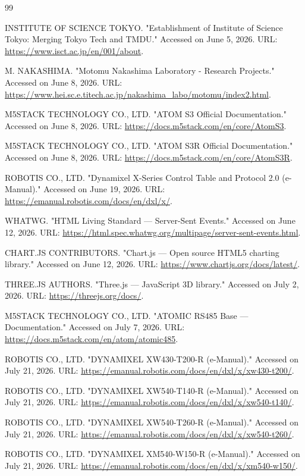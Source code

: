 \documentclass{tropLaClasse}
\begin{document}
\begin{thebibliography}{99}
\setcounter{enumiv}{15} %

\vspace{-0.5cm}

 INSTITUTE OF SCIENCE TOKYO. "Establishment of Institute of Science Tokyo: Merging Tokyo Tech and TMDU." Accessed on June 5, 2026. URL: \url{https://www.isct.ac.jp/en/001/about}.

 M. NAKASHIMA. "Motomu Nakashima Laboratory - Research Projects." Accessed on June 8, 2026. URL: \url{https://www.hei.sc.e.titech.ac.jp/nakashima_labo/motomu/index2.html}.

 M5STACK TECHNOLOGY CO., LTD. "ATOM S3 Official Documentation." Accessed on June 8, 2026. URL: \url{https://docs.m5stack.com/en/core/AtomS3}.

 M5STACK TECHNOLOGY CO., LTD. "ATOM S3R Official Documentation." Accessed on June 8, 2026. URL: \url{https://docs.m5stack.com/en/core/AtomS3R}.

 ROBOTIS CO., LTD. "Dynamixel X-Series Control Table and Protocol 2.0 (e-Manual)." Accessed on June 19, 2026. URL: \url{https://emanual.robotis.com/docs/en/dxl/x/}.

 WHATWG. "HTML Living Standard --- Server-Sent Events." Accessed on June 12, 2026. URL: \url{https://html.spec.whatwg.org/multipage/server-sent-events.html}.

 CHART.JS CONTRIBUTORS. "Chart.js --- Open source HTML5 charting library." Accessed on June 12, 2026. URL: \url{https://www.chartjs.org/docs/latest/}.

 THREE.JS AUTHORS. "Three.js --- JavaScript 3D library." Accessed on July 2, 2026. URL: \url{https://threejs.org/docs/}.

 M5STACK TECHNOLOGY CO., LTD. "ATOMIC RS485 Base --- Documentation." Accessed on July 7, 2026. URL: \url{https://docs.m5stack.com/en/atom/atomic485}.

 ROBOTIS CO., LTD. "DYNAMIXEL XW430-T200-R (e-Manual)." Accessed on July 21, 2026. URL: \url{https://emanual.robotis.com/docs/en/dxl/x/xw430-t200/}.

 ROBOTIS CO., LTD. "DYNAMIXEL XW540-T140-R (e-Manual)." Accessed on July 21, 2026. URL: \url{https://emanual.robotis.com/docs/en/dxl/x/xw540-t140/}.

 ROBOTIS CO., LTD. "DYNAMIXEL XW540-T260-R (e-Manual)." Accessed on July 21, 2026. URL: \url{https://emanual.robotis.com/docs/en/dxl/x/xw540-t260/}.

 ROBOTIS CO., LTD. "DYNAMIXEL XM540-W150-R (e-Manual)." Accessed on July 21, 2026. URL: \url{https://emanual.robotis.com/docs/en/dxl/x/xm540-w150/}.

\end{thebibliography}
\end{document}
